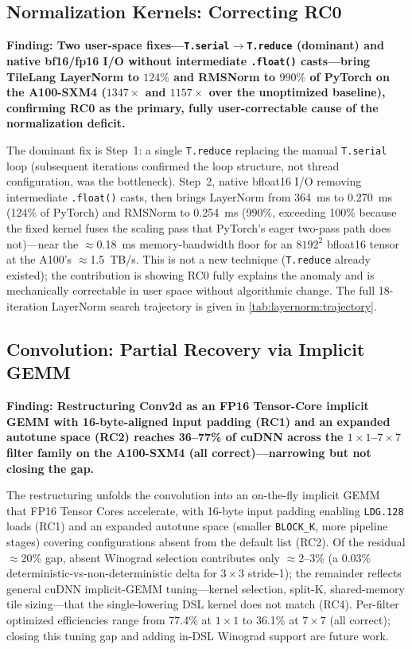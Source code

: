 
\subsection{Normalization Kernels: Correcting RC0}
\label{sec:mitig:norm}

\medskip\noindent\textbf{Finding: Two user-space fixes---\texttt{T.serial}$\to$\texttt{T.reduce} (dominant) and native bf16/fp16 I/O without intermediate \texttt{.float()} casts---bring TileLang LayerNorm to $124\%$ and RMSNorm to $990\%$ of PyTorch on the A100-SXM4 ($1347\times$ and $1157\times$ over the unoptimized baseline), confirming RC0 as the primary, fully user-correctable cause of the normalization deficit.}

The dominant fix is Step~1: a single \texttt{T.reduce} replacing the manual \texttt{T.serial} loop (subsequent iterations confirmed the loop structure, not thread configuration, was the bottleneck).
Step~2, native bfloat16 I/O removing intermediate \texttt{.float()} casts, then brings LayerNorm from 364~ms to 0.270~ms (124\% of PyTorch) and RMSNorm to 0.254~ms (990\%, exceeding 100\% because the fixed kernel fuses the scaling pass that PyTorch's eager two-pass path does not)---near the $\approx$0.18~ms memory-bandwidth floor for an $8192^2$ bfloat16 tensor at the A100's $\approx$1.5~TB/s.
This is not a new technique (\texttt{T.reduce} already existed); the contribution is showing RC0 fully explains the anomaly and is mechanically correctable in user space without algorithmic change.
The full 18-iteration LayerNorm search trajectory is given in \cref{tab:layernorm:trajectory}.

\subsection{Convolution: Partial Recovery via Implicit GEMM}
\label{sec:mitig:conv}

\medskip\noindent\textbf{Finding: Restructuring Conv2d as an FP16 Tensor-Core implicit GEMM with 16-byte-aligned input padding (RC1) and an expanded autotune space (RC2) reaches 36--77\% of cuDNN across the $1\times1$--$7\times7$ filter family on the A100-SXM4 (all correct)---narrowing but not closing the gap.}

The restructuring unfolds the convolution into an on-the-fly implicit GEMM~\cite{zhou2021implicit} that FP16 Tensor Cores accelerate, with 16-byte input padding enabling \texttt{LDG.128} loads (RC1) and an expanded autotune space (smaller \texttt{BLOCK\_K}, more pipeline stages) covering configurations absent from the default list (RC2).
Of the residual $\approx$20\% gap, absent Winograd selection contributes only $\approx$2--3\% (a 0.03\% deterministic-vs-non-deterministic delta for $3\times3$ stride-1); the remainder reflects general cuDNN implicit-GEMM tuning---kernel selection, split-K, shared-memory tile sizing---that the single-lowering DSL kernel does not match (RC4).
Per-filter optimized efficiencies range from 77.4\% at $1\times1$ to 36.1\% at $7\times7$ (all correct); closing this tuning gap and adding in-DSL Winograd support are future work.

